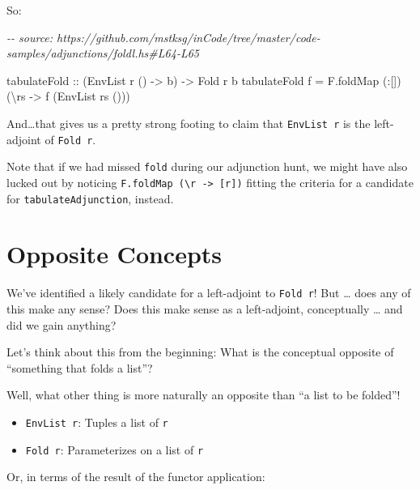 \documentclass[]{article}
\newenvironment{Shaded}{}{}
\newcommand{\CommentTok}[1]{\textcolor[rgb]{0.38,0.63,0.69}{\textit{#1}}}
\newcommand{\DataTypeTok}[1]{\textcolor[rgb]{0.56,0.13,0.00}{#1}}
\newcommand{\NormalTok}[1]{#1}
\newcommand{\OperatorTok}[1]{\textcolor[rgb]{0.40,0.40,0.40}{#1}}
\newcommand{\OtherTok}[1]{\textcolor[rgb]{0.00,0.44,0.13}{#1}}
\begin{document}
So:

\begin{Shaded}
\begin{Highlighting}[]
\CommentTok{{-}{-} source: https://github.com/mstksg/inCode/tree/master/code{-}samples/adjunctions/foldl.hs\#L64{-}L65}

\OtherTok{tabulateFold ::}\NormalTok{ (}\DataTypeTok{EnvList}\NormalTok{ r () }\OtherTok{{-}>}\NormalTok{ b) }\OtherTok{{-}>} \DataTypeTok{Fold}\NormalTok{ r b}
\NormalTok{tabulateFold f }\OtherTok{=}\NormalTok{ F.foldMap (}\OperatorTok{:}\NormalTok{[]) (\textbackslash{}rs }\OtherTok{{-}>}\NormalTok{ f (}\DataTypeTok{EnvList}\NormalTok{ rs ()))}
\end{Highlighting}
\end{Shaded}

And\ldots that gives us a pretty strong footing to claim that
\texttt{EnvList\ r} is the left-adjoint of \texttt{Fold\ r}.

Note that if we had missed \texttt{fold} during our adjunction hunt, we might
have also lucked out by noticing
\texttt{F.foldMap\ (\textbackslash{}r\ -\textgreater{}\ {[}r{]})} fitting the
criteria for a candidate for \texttt{tabulateAdjunction}, instead.

\hypertarget{opposite-concepts}{%
\section{Opposite Concepts}\label{opposite-concepts}}

We've identified a likely candidate for a left-adjoint to \texttt{Fold\ r}! But
\ldots{} does any of this make any sense? Does this make sense as a
left-adjoint, conceptually \ldots{} and did we gain anything?

Let's think about this from the beginning: What is the conceptual opposite of
``something that folds a list''?

Well, what other thing is more naturally an opposite than ``a list to be
folded''!

\begin{itemize}
\tightlist
\item
  \texttt{EnvList\ r}: Tuples a list of \texttt{r}
\item
  \texttt{Fold\ r}: Parameterizes on a list of \texttt{r}
\end{itemize}

Or, in terms of the result of the functor application:
\end{document}
